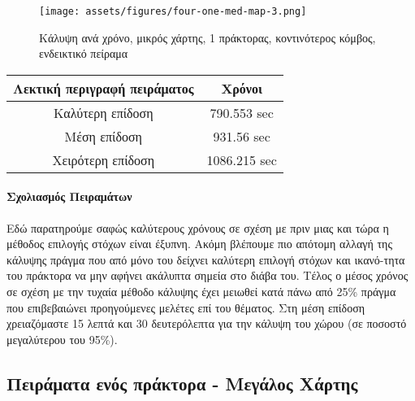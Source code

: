 
\begin{figure}[!h]
	\centering
	\texttt{[image: assets/figures/four-one-med-map-3.png]}
	\caption{Κάλυψη ανά χρόνο, μικρός χάρτης, 1 πράκτορας, κοντινότερος κόμβος, ενδεικτικό πείραμα}
\end{figure}



\newpage

\begingroup
\centering
\begin{tabular}{c | c }
	\textbf{Λεκτική περιγραφή πειράματος} & \textbf{Χρόνοι}\\ \hline{}
	Καλύτερη επίδοση & 790.553 sec \\ \hline
	Μέση επίδοση & 931.56 sec   \\ \hline
	Χειρότερη επίδοση & 1086.215 sec \\ 
\end{tabular}
\endgroup

\paragraph{Σχολιασμός Πειραμάτων}



Εδώ παρατηρούμε σαφώς καλύτερους χρόνους σε σχέση με πριν μιας και τώρα η μέθοδος επιλογής στόχων είναι έξυπνη. Ακόμη βλέπουμε πιο απότομη αλλαγή της κάλυψης πράγμα που από μόνο του δείχνει καλύτερη επιλογή στόχων και ικανό-τητα του πράκτορα να μην αφήνει ακάλυπτα σημεία στο διάβα του. Τέλος ο μέσος χρόνος σε σχέση με την τυχαία μέθοδο κάλυψης έχει μειωθεί κατά πάνω από 25\% πράγμα που επιβεβαιώνει προηγούμενες μελέτες επί του θέματος.
Στη μέση επίδοση χρειαζόμαστε 15 λεπτά και 30 δευτερόλεπτα για την κάλυψη του χώρου (σε ποσοστό μεγαλύτερου του 95\%).

\newpage

\subsection{Πειράματα ενός πράκτορα - Μεγάλος Χάρτης}

